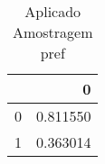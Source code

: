 \begin{table}
\centering
\caption{Aplicado Amostragem pref}
\label{Aplicado Amostragem pref 11}
\begin{tabular}{lr}
\toprule
{} &         0 \\
\midrule
0 &  0.811550 \\
1 &  0.363014 \\
\bottomrule
\end{tabular}
\end{table}
